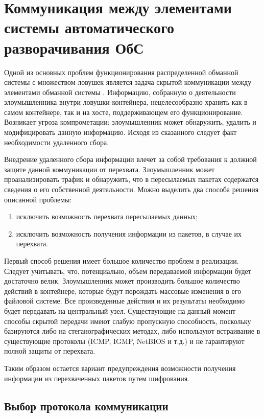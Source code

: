 \section{Коммуникация между элементами системы автоматического разворачивания ОбС}

Одной из основных проблем функционирования распределенной обманной системы с множеством ловушек является задача скрытой коммуникации между элементами обманной системы \citep{Peskova2014}. Информацию, собранную о деятельности злоумышленника внутри ловушки-контейнера, нецелесообразно хранить как в самом контейнере, так и на хосте, поддерживающем его функционирование. Возникает угроза компрометации: злоумышленник может обнаружить, удалить и модифицировать данную информацию. Исходя из сказанного следует факт необходимости удаленного сбора. 

Внедрение удаленного сбора информации влечет за собой требования к должной защите данной коммуникации от перехвата. Злоумышленник может проанализировать трафик и обнаружить, что в пересылаемых пакетах содержатся сведения о его собственной деятельности. Можно выделить два способа решения описанной проблемы:
\begin{enumerate}
	\item исключить возможность перехвата пересылаемых данных;
	\item исключить возможность получения информации из пакетов, в случае их перехвата.
\end{enumerate}

Первый способ решения имеет большое количество проблем в реализации. Следует учитывать, что, потенциально, объем передаваемой информации будет достаточно велик. Злоумышленник может производить большое количество действий в контейнере, которые будут порождать массовые изменения в его файловой системе. Все произведенные действия и их результаты необходимо будет передавать на центральный узел. Существующие на данный момент способы скрытой передачи имеют слабую пропускную способность, поскольку базируются либо на стеганографических методах, либо используют встраивание в существующие протоколы (ICMP, IGMP, NetBIOS и т.д.) и не гарантируют полной защиты от перехвата.

Таким образом остается вариант предупреждения возможности получения информации из перехваченных пакетов путем шифрования.

\subsection{Выбор протокола коммуникации}

